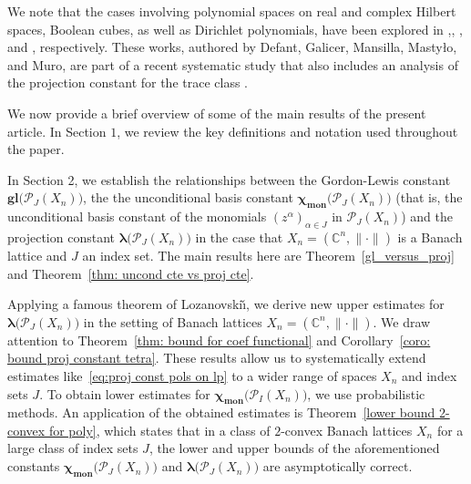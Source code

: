 \documentclass[12pt]{amsart}
\numberwithin{subsection}{section}
\theoremstyle{definition}
\theoremstyle{remark}
\DeclareMathOperator{\mon}{mon}
\newcommand{\chimon}{\chi_{\mon}}
\begin{document}
We note that the cases involving polynomial spaces on real and complex Hilbert spaces, Boolean cubes, as well as Dirichlet polynomials, have been explored in \cite{defant2024minimalarxiv},\cite{defant2024ryll}, \cite{defant2024asymptotic}, and \cite{defant2024projection}, respectively. These works, authored by Defant, Galicer, Mansilla, Masty{\l}o, and Muro, are part of a recent systematic study that also includes an analysis of the projection constant for the trace class \cite{defant2024trace}.

We now provide a brief overview of some of the main results of the present article. In Section $1$, we review the key definitions and notation used
throughout the paper.

In Section 2, we establish the relationships between  the Gordon-Lewis constant ${\boldsymbol{g\!l}}\big(\mathcal{P}_{J}(X_n)\big)$,
the the unconditional basis constant $\boldsymbol{\chimon}\big(\mathcal{P}_{J}(X_n) \big)$ (that is, the unconditional basis constant
of the monomials $(z^\alpha)_{\alpha \in J}$ in $\mathcal{P}_{J}(X_n)$) and the projection constant
$\boldsymbol{\lambda}\big(\mathcal{P}_{J}(X_n)\big)$ in the case that $X_n = (\mathbb{C}^n, \|\cdot\|)$ is a Banach lattice
and $J$ an index set. The main results here are Theorem~\ref{gl_versus_proj} and Theorem~\ref{thm: uncond cte vs proj cte}.

Applying a famous theorem of Lozanovski\v{\i}, we derive new  upper estimates for $\boldsymbol{\lambda}(\mathcal{P}_{J}(X_n)\big)$ in the
setting of Banach lattices $X_n = (\mathbb{C}^n, \|\cdot\|)$. We draw attention to Theorem~\ref{thm: bound for coef functional} and
Corollary~\ref{coro: bound proj constant tetra}. These results allow us to systematically extend estimates like~\eqref{eq:proj const pols on lp}
to a wider range of spaces $X_n$ and index sets $J$. To obtain lower estimates for $\boldsymbol{\chimon}\big(\mathcal{P}_{I}(X_n)\big)$, we use probabilistic methods. An application of the obtained estimates is Theorem~\ref{lower bound 2-convex for poly}, which states that in
a class of $2$-convex Banach lattices $X_n$ for a large class of index sets $J$, the lower and upper bounds of the aforementioned constants
$\boldsymbol{\chimon}\big( \mathcal{P}_{J}(X_n) \big)$ and $\boldsymbol{\lambda}\big(\mathcal{P}_{J}(X_n)\big)$ are asymptotically
correct.
\end{document}
